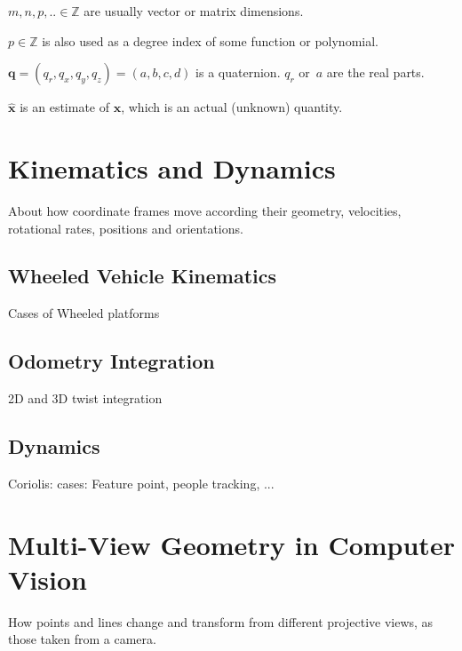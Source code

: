 \documentclass[a4paper,11pt]{article}
\begin{document}
$m,n,p,.. \in \mathbb{Z}$ are usually vector or matrix dimensions.

$p \in \mathbb{Z}$ is also used as a degree index of some function or polynomial. 

$\mathbf{q} = (q_r,q_x,q_y,q_z) = (a,b,c,d)$ is a quaternion. $q_r$ or~$a$ are the real parts.

$\hat{\mathbf{x}}$ is an estimate of $\mathbf{x}$, which is an actual (unknown) quantity.

\newpage


\newpage


\newpage


\newpage


\newpage


\newpage


\newpage


\newpage


\newpage
\section{Kinematics and Dynamics}
About how coordinate frames move according their geometry, velocities, rotational rates, positions and orientations. 

\subsection{Wheeled Vehicle Kinematics}
Cases of Wheeled platforms

\subsection{Odometry Integration}
2D and 3D twist integration

\subsection{Dynamics}
Coriolis: cases: Feature point, people tracking, ...

\newpage



\newpage
\section{Multi-View Geometry in Computer Vision}
How points and lines change and transform from different projective views, as those taken from a camera.
\end{document}
